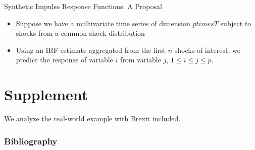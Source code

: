 \documentclass{beamer}
\theoremstyle{definition}
\begin{document}
\begin{frame}{Synthetic Impulse Response Functions: A Proposal}
    \begin{itemize}
        \item Suppose we have a multivariate time series of dimension $p times T$ subject to shocks from a common shock distribution
        \item Using an IRF estimate aggregated from the first $n$ shocks of interest, we predict the response of variable $i$ from variable $j$, $1\leq i \leq j \leq p$. 
    \end{itemize}
    
\end{frame}
\section{Supplement}
We analyze the real-world example with Brexit included.

\begin{frame}
    \frametitle{Bibliography}

\printbibliography
\end{frame}
\end{document}
